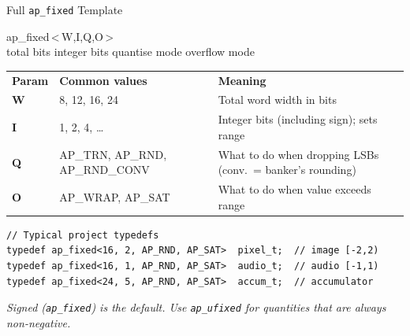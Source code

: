 \documentclass[aspectratio=169,12pt]{beamer}
\begin{document}
\begin{frame}[t,fragile]{Full \texttt{ap\_fixed} Template}
\vspace{0.01cm}
\begin{center}
\colorbox{NavyDk}{\parbox{0.9\textwidth}{%
  \vspace{2pt}\centering
  {\color{Orange}\ttfamily\normalsize ap\_fixed\,<\,W,\;I,\;Q,\;O\,>}\\
  {\color{LtGray}\footnotesize
    total bits \hspace{1.2cm} integer bits
    \hspace{0.9cm} quantise mode
    \hspace{0.6cm} overflow mode}
  \vspace{2pt}
}}
\end{center}
\vspace{0.02cm}
{\setlength{\extrarowheight}{0pt}
{\small\begin{tabular}{>{\ttfamily\bfseries}p{1.4cm}p{3.2cm}p{7.5cm}}
\rowcolor{Navy!15}
\textbf{Param} & \textbf{Common values} & \textbf{Meaning}\\
W & 8, 12, 16, 24 & Total word width in bits\\
I & 1, 2, 4, \ldots & Integer bits (including sign); sets range\\
Q & AP\_TRN, AP\_RND, AP\_RND\_CONV & What to do when dropping LSBs (conv.\ = banker's rounding)\\
O & AP\_WRAP, AP\_SAT & What to do when value exceeds range\\
\end{tabular}}}
\vspace{0.02cm}
\begin{lstlisting}[basicstyle=\ttfamily\scriptsize,aboveskip=1pt,belowskip=0pt]
// Typical project typedefs
typedef ap_fixed<16, 2, AP_RND, AP_SAT>  pixel_t;  // image [-2,2)
typedef ap_fixed<16, 1, AP_RND, AP_SAT>  audio_t;  // audio [-1,1)
typedef ap_fixed<24, 5, AP_RND, AP_SAT>  accum_t;  // accumulator
\end{lstlisting}
\vspace{0.01cm}
{\scriptsize\color{MidGray}\itshape
  Signed (\texttt{ap\_fixed}) is the default.
  Use \texttt{ap\_ufixed} for quantities that are always non-negative.}
\end{frame}
\end{document}
